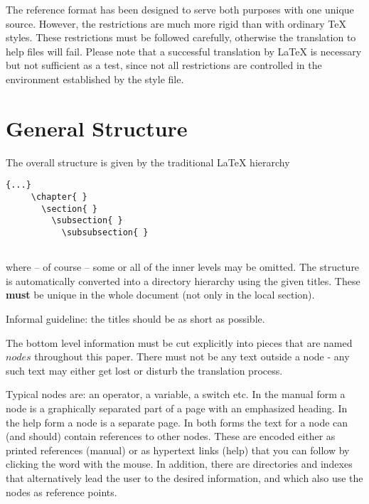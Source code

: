 The reference format has been designed to serve both purposes with one
unique source. However, the restrictions are much more rigid than with
ordinary \TeX{} styles. These restrictions must be followed carefully,
otherwise the translation to help files will fail. Please note that a
successful translation by \LaTeX{} is necessary but not sufficient as a
test, since not all restrictions are controlled in the environment
established by the style file.

\section{General Structure}

The overall structure is given by the traditional \LaTeX{} hierarchy 
\begin{verbatim}
{...}
     \chapter{ }
       \section{ }
         \subsection{ }
           \subsubsection{ }
  
\end{verbatim}

where -- of course -- some or all of the inner levels may be omitted. The
structure is automatically converted into a directory hierarchy using the
given titles. These {\bf must} be unique in the whole document (not only in
the local section).

Informal guideline: the titles should be as short as possible.

The bottom level information must be cut explicitly into pieces that are
named $nodes$ throughout this paper. There must not be any text outside a
node - any such text may either get lost or disturb the translation process.

Typical nodes are: an operator, a variable, a switch etc. In the manual form
a node is a graphically separated part of a page with an emphasized heading.
In the help form a node is a separate page. In both forms the text for a
node can (and should) contain references to other nodes. These are encoded
either as printed references (manual) or as hypertext links (help) that you
can follow by clicking the word with the mouse. In addition, there are
directories and indexes that alternatively lead the user to the desired
information, and which also use the nodes as reference points.

